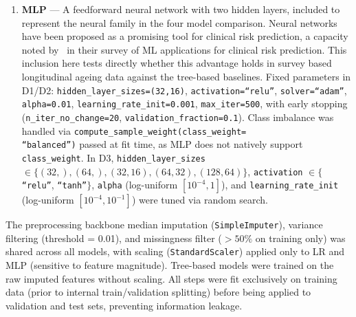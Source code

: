\begin{enumerate}
    \item \textbf{\gls{MLP}} --- A feedforward neural network with two hidden layers, included to represent the neural family in the four model comparison. Neural networks have been proposed as a promising tool for clinical risk prediction, a capacity noted by~\cite{obermeyerPredictingFutureBig2016} in their survey of \gls{ML} applications for clinical risk prediction. This inclusion here tests directly whether this advantage holds in survey based longitudinal ageing data against the tree-based baselines. Fixed parameters in D1/D2: \texttt{hidden\_layer\_sizes=(32,16)}, \texttt{activation=``relu''}, \texttt{solver=``adam''}, \texttt{alpha=0.01}, \texttt{learning\_rate\_init=0.001}, \texttt{max\_iter=500}, with early stopping (\texttt{n\_iter\_no\_change=20}, \texttt{validation\_fraction=0.1}). Class imbalance was handled via \texttt{compute\_sample\_weight(class\_weight=\\``balanced'')} passed at fit time, as \gls{MLP} does not natively support \texttt{class\_weight}. In D3, \texttt{hidden\_layer\_sizes} $\in \{(32,), (64,), (32{,}16), (64{,}32), (128{,}64)\}$, \texttt{activation} $\in \{$\texttt{``relu''}, \texttt{``tanh''}$\}$, \texttt{alpha} (log-uniform $[10^{-4}, 1]$), and \texttt{learning\_rate\_init} (log-uniform $[10^{-4}, 10^{-1}]$) were tuned via random search.
\end{enumerate}

The preprocessing backbone median imputation (\texttt{SimpleImputer}), variance filtering (threshold = 0.01), and missingness filter ($>50\%$ on training only) was shared across all models, with scaling (\texttt{StandardScaler}) applied only to \gls{LR} and \gls{MLP} (sensitive to feature magnitude). Tree-based models were trained on the raw imputed features without scaling. All steps were fit exclusively on training data (prior to internal train/validation splitting) before being applied to validation and test sets, preventing information leakage.

